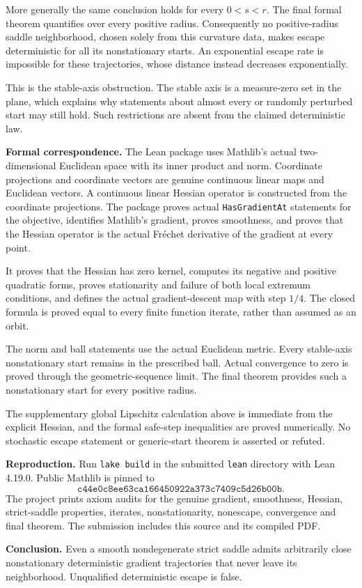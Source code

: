 \documentclass[11pt]{article}
\begin{document}
More generally the same conclusion holds for every $0<s<r$. The final formal theorem quantifies over every positive radius. Consequently no positive-radius saddle neighborhood, chosen solely from this curvature data, makes escape deterministic for all its nonstationary starts. An exponential escape rate is impossible for these trajectories, whose distance instead decreases exponentially.

This is the stable-axis obstruction. The stable axis is a measure-zero set in the plane, which explains why statements about almost every or randomly perturbed start may still hold. Such restrictions are absent from the claimed deterministic law.

\textbf{Formal correspondence.}
The Lean package uses Mathlib's actual two-dimensional Euclidean space with its inner product and norm. Coordinate projections and coordinate vectors are genuine continuous linear maps and Euclidean vectors. A continuous linear Hessian operator is constructed from the coordinate projections. The package proves actual \texttt{HasGradientAt} statements for the objective, identifies Mathlib's gradient, proves smoothness, and proves that the Hessian operator is the actual Fr\'echet derivative of the gradient at every point.

It proves that the Hessian has zero kernel, computes its negative and positive quadratic forms, proves stationarity and failure of both local extremum conditions, and defines the actual gradient-descent map with step $1/4$. The closed formula is proved equal to every finite function iterate, rather than assumed as an orbit.

The norm and ball statements use the actual Euclidean metric. Every stable-axis nonstationary start remains in the prescribed ball. Actual convergence to zero is proved through the geometric-sequence limit. The final theorem provides such a nonstationary start for every positive radius.

The supplementary global Lipschitz calculation above is immediate from the explicit Hessian, and the formal safe-step inequalities are proved numerically. No stochastic escape statement or generic-start theorem is asserted or refuted.

\textbf{Reproduction.}
Run \texttt{lake build} in the submitted \texttt{lean} directory with Lean 4.19.0. Public Mathlib is pinned to
\[
 \texttt{c44e0c8ee63ca166450922a373c7409c5d26b00b}.
\]
The project prints axiom audits for the genuine gradient, smoothness, Hessian, strict-saddle properties, iterates, nonstationarity, nonescape, convergence and final theorem. The submission includes this source and its compiled PDF.

\textbf{Conclusion.}
Even a smooth nondegenerate strict saddle admits arbitrarily close nonstationary deterministic gradient trajectories that never leave its neighborhood. Unqualified deterministic escape is false.
\end{document}
